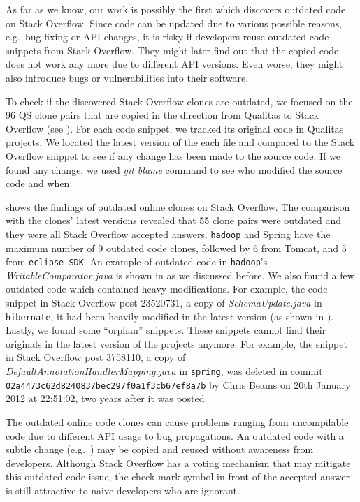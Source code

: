 \documentclass{sig-alternate-05-2015}
\begin{document}
As far as we know, our work is possibly the first which discovers outdated code on Stack Overflow. Since code can be updated due to various possible reasons, e.g.~bug fixing or API changes, it is risky if developers reuse outdated code snippets from Stack Overflow.
They might later find out that the copied code does not work any more due to different API versions. Even worse, they might also introduce bugs or vulnerabilities into their software. 

To check if the discovered Stack Overflow clones are outdated, we focused on the 96 QS clone pairs that are copied in the direction from Qualitas to Stack Overflow (see ). For each code snippet, we tracked its original code in Qualitas projects. We located the latest version of the each file and compared to the Stack Overflow snippet to see if any change has been made to the source code. If we found any change, we used \textit{git blame} command to see who modified the source code and when.

 shows the findings of outdated online clones on Stack Overflow. The comparison with the clones' latest versions revealed that 55 clone pairs were outdated and they were all Stack Overflow accepted answers. \texttt{hadoop} and Spring have the maximum number of 9 outdated code clones, followed by 6 from Tomcat, and 5 from \texttt{eclipse-SDK}. An example of outdated code in \texttt{hadoop}'s \textit{WritableComparator.java} is shown in  as we discussed before. We also found a few outdated code which contained heavy modifications. For example, the code snippet in Stack Overflow post 23520731, a copy of \textit{SchemaUpdate.java} in \texttt{hibernate}, it had been heavily modified in the latest version (as shown in ). Lastly, we found some ``orphan'' snippets. These snippets cannot find their originals in the latest version of the projects anymore. For example, the snippet in Stack Overflow post 3758110, a copy of \textit{DefaultAnnotationHandlerMapping.java} in \texttt{spring}, was deleted in commit \texttt{02a4473c62d8240837bec297f0a1f3cb67ef8a7b} by Chris Beams on 20th January 2012 at 22:51:02, two years after it was posted. %

The outdated online code clones can cause problems ranging from uncompilable code due to different API usage to bug propagations. An outdated code with a subtle change (e.g.~) may be copied and reused without awareness from developers. Although Stack Overflow has a voting mechanism that may mitigate this outdated code issue, the check mark symbol in front of the accepted answer is still attractive to naive developers who are ignorant.
\end{document}
